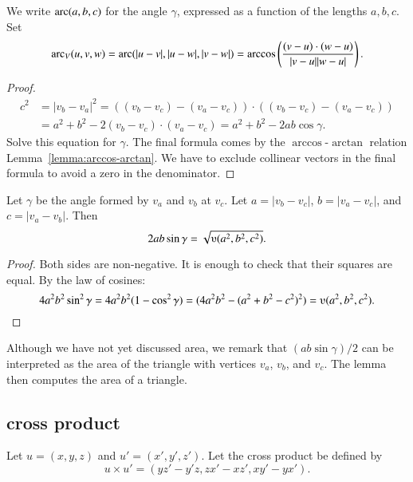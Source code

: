 \begin{definition}
We write $\operatorname{arc}(a,b,c)$ for the angle $\gamma$, expressed as a function
of the lengths $a,b,c$.  Set 
  $$\operatorname{arc}_V(u,v,w) = \operatorname{arc}(|u-v|,|u-w|,|v-w|) = 
    \arccos\left(\frac{(v-u)\cdot (w-u)}{|v-u| |w-u|}\right).$$
\end{definition}

\begin{proof}
    $$\begin{array}{lll}c^2 &= |v_b - v_a|^2 = ((v_b - v_c) - (v_a - v_c))\cdot ((v_b - v_c) - (v_a -
    v_c)) \\ &= a^2 + b^2 - 2 (v_b - v_c)\cdot (v_a - v_c) = a^2 +b ^2 - 2 a b
    \cos\gamma.
    \end{array}$$
    Solve this equation for $\gamma$.  The final formula
    comes by the $\arccos$-$\arctan$ relation Lemma~\ref{lemma:arccos-arctan}.  We
    have to exclude collinear vectors in the final formula to avoid
    a zero in the denominator.
\end{proof}

\begin{lemma}
   Let $\gamma$ be the angle formed by $v_a$ and $v_b$ at $v_c$.  Let $a
    = |v_b - v_c|$, $b = |v_a - v_c|$, and $c = |v_a - v_b|$.  Then
        $$2 a b \sin\gamma = \sqrt{\ups(a^2,b^2,c^2)}.$$
\end{lemma}

\begin{proof}  Both sides are non-negative.  It is enough to check
that their squares are equal.  By the law of cosines:
      $$4 a^2 b^2 \sin^2\gamma = 4 a^2 b^2 (1-\cos^2\gamma) = (4 a^2 b^2 - (a^2 + b^2 -
      c^2)^2) = \ups(a^2,b^2,c^2).$$
\end{proof}

\begin{remark}  Although we have not yet discussed area, we remark
that $(a b \sin\gamma)/2$ can be interpreted as the area of the
triangle with vertices $v_a$, $v_b$, and $v_c$.  The lemma then
computes the area of a triangle.
\end{remark}





\subsection{cross product}%

\begin{definition}   Let $u =(x,y,z)$ and $u' = (x',y',z')$.  
Let the cross product be defined
by
    $$
    u \times u' = (y z' - y' z, z x' - x z', x y' - y x').
    $$
\end{definition}

